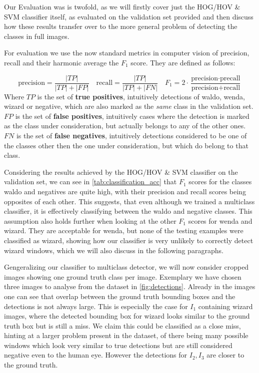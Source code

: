 \documentclass[11pt]{article}
\begin{document}
Our Evaluation was is twofold, as we will firstly cover just the HOG/HOV \& SVM classifier itself, as evaluated on the
validation set provided and then discuss how these results transfer over to the more general problem of detecting the classes in
full images.

For evaluation we use the now standard metrics in computer vision of precision, recall and their harmonic average the \( F_1 \) score.
They are defined as follows:

\begin{equation*}
    \text{precision} = \frac{|TP|}{|TP| + |FP|}
    \quad
    \text{recall} = \frac{|TP|}{|TP| + |FN|}
    \quad
    F_1 = 2\cdot \frac{\text{precision} \cdot \text{precall}}{\text{precision} + \text{recall}}
\end{equation*}
Where \( TP \) is the set of \textbf{true positives}, intuitively detections of waldo, wenda, wizard or negative, which are also marked
as the \textit{same} class in the validation set.
\( FP \) is the set of \textbf{false positives}, intuitively cases where the detection is marked as the class under consideration, but actually belongs to any of the other ones.
\( FN \) is the set of \textbf{false negatives}, intuitively detections considered to be one of the classes other then the one under consideration, but which do belong to that class.

Considering the results achieved by the HOG/HOV \& SVM classifier on the validation set,
we can see in \autoref{tab:classification_acc} that \( F_1 \) scores for the classes waldo and negatives are quite high, with
their precision and recall scores being opposites of each other. This suggests, that even although we trained a multiclass classifier,
it is effectively classifying between the waldo and negative classes. This assumption also holds further when looking at the other
\( F_1 \) scores for wenda and wizard. They are acceptable for wenda, but none of the testing examples were classified as wizard,
showing how our classifier is very unlikely to correctly detect wizard windows, which we will also discuss in the following paragraphs.

Gengeralizing our classifier to multiclass detector, we will now consider cropped images showing one ground truth class per image.
Exemplary we have chosen three images to analyse from the dataset in \autoref{fig:detections}.
Already in the images one can see that overlap between the ground truth bounding boxes and the detections is not always large.
This is especially the case for \( I_1 \) containing wizard images, where the detected bounding box for wizard looks similar to the
ground truth box but is still a miss. We claim this could be classified as a close miss, hinting at a larger problem present in the dataset,
of there being many possible windows which look very similar to true detections but are still considered negative even to the human eye.
However the detections for \( I_2, I_3 \) are closer to the ground truth.
\end{document}
